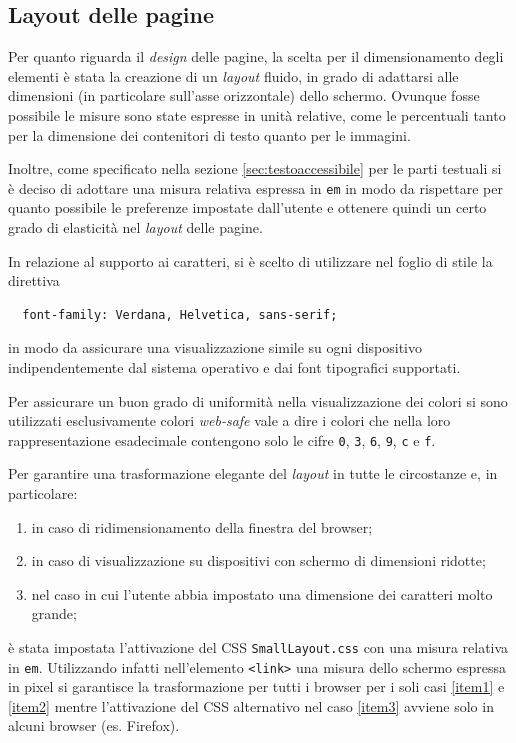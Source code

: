 \documentclass[10pt,a4paper,onecolumn]{article}
\newcommand{\inglese}[1]{\foreignlanguage{english}{\itshape{}#1}}
\begin{document}
\subsection{Layout delle pagine}
Per quanto riguarda il \inglese{design} delle pagine, la scelta per il dimensionamento degli elementi è stata la creazione di un \inglese{layout} fluido, in grado di adattarsi alle dimensioni (in particolare sull'asse orizzontale) dello schermo. Ovunque fosse possibile le misure sono state espresse in unità relative, come le percentuali tanto per la dimensione dei contenitori di testo quanto per le immagini.


Inoltre, come specificato nella sezione \ref{sec:testoaccessibile} per le parti testuali si è deciso di adottare una misura relativa espressa in \texttt{em} in modo da rispettare per quanto possibile le preferenze impostate dall'utente e ottenere quindi un certo grado di elasticità nel \inglese{layout} delle pagine.

In relazione al supporto ai caratteri, si è scelto di utilizzare nel foglio di stile la direttiva
\begin{verbatim}
  font-family: Verdana, Helvetica, sans-serif;
\end{verbatim}
in modo da assicurare una visualizzazione simile su ogni dispositivo indipendentemente dal sistema operativo e dai font tipografici supportati.

Per assicurare un buon grado di uniformità nella visualizzazione dei colori si sono utilizzati esclusivamente colori \inglese{web-safe} vale a dire i colori che nella loro rappresentazione esadecimale contengono solo le cifre \verb+0+, \verb+3+, \verb+6+, \verb+9+, \verb+c+ e \verb+f+.

Per garantire una trasformazione elegante del \inglese{layout} in tutte le circostanze e, in particolare:
\begin{enumerate}[noitemsep,nolistsep,label=\emph{\alph*})]
  \item\label{item1} in caso di ridimensionamento della finestra del browser;
  \item\label{item2} in caso di visualizzazione su dispositivi con schermo di dimensioni ridotte;
  \item\label{item3} nel caso in cui l'utente abbia impostato una dimensione dei caratteri molto grande;
\end{enumerate}
è stata impostata l'attivazione del CSS \texttt{SmallLayout.css} con una misura relativa in \texttt{em}. Utilizzando infatti nell'elemento \texttt{<link>} una misura dello schermo espressa in pixel si garantisce la trasformazione per tutti i browser per i soli casi \ref{item1} e \ref{item2} mentre l'attivazione del CSS alternativo nel caso \ref{item3} avviene solo in alcuni browser (es. Firefox).
\end{document}
